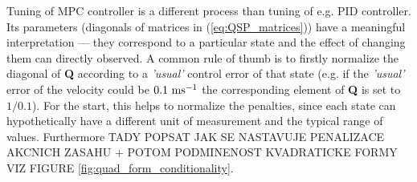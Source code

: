 Tuning of MPC controller is a different process than tuning of e.g. PID controller. Its parameters (diagonals of matrices in (\ref{eq:QSP_matrices})) have a meaningful interpretation --- they correspond to a particular state and the effect of changing them can directly observed. A common rule of thumb is to firstly normalize the diagonal of \textbf{Q} according to a \textit{'usual'} control error of that state (e.g. if the \textit{'usual'} error of the velocity could be $0.1~\mathrm{ms^{-1}}$ the corresponding element of \textbf{Q} is set to $1/0.1$). For the start, this helps to normalize the penalties, since each state can hypothetically have a different unit of measurement and the typical range of values. Furthermore TADY POPSAT JAK SE NASTAVUJE PENALIZACE AKCNICH ZASAHU + POTOM PODMINENOST KVADRATICKE FORMY VIZ FIGURE \ref{fig:quad_form_conditionality}.

